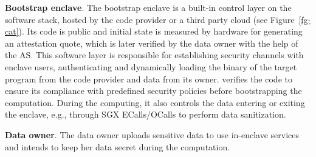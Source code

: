 
\vspace{3pt}\noindent\textbf{Bootstrap enclave}. The bootstrap enclave is a built-in control layer on the software stack, hosted by the code provider or a third party cloud  (see Figure~\ref{fg-cat}). Its code is public and initial state is measured by hardware for generating an attestation quote, which is later verified by the data owner with the help of the AS. This software layer is responsible for establishing security channels with enclave users, authenticating and dynamically loading the binary of the target program from the code provider and data from its owner. \DIFdelbegin {}\DIFdelend \DIFaddbegin {}\DIFaddend verifies the code to ensure its compliance with predefined security policies before bootstrapping the computation. During the computing, it also controls the data entering or exiting the enclave, e.g., through SGX ECalls/OCalls to perform data sanitization.

\vspace{3pt}\noindent\textbf{Data owner}. The data owner uploads sensitive data \DIFdelbegin {}\DIFdelend to use in-enclave services \DIFdelbegin {}\DIFdelend and intends to keep her data secret during the computation. 
\DIFdelbegin {}%
\DIFdelend 


